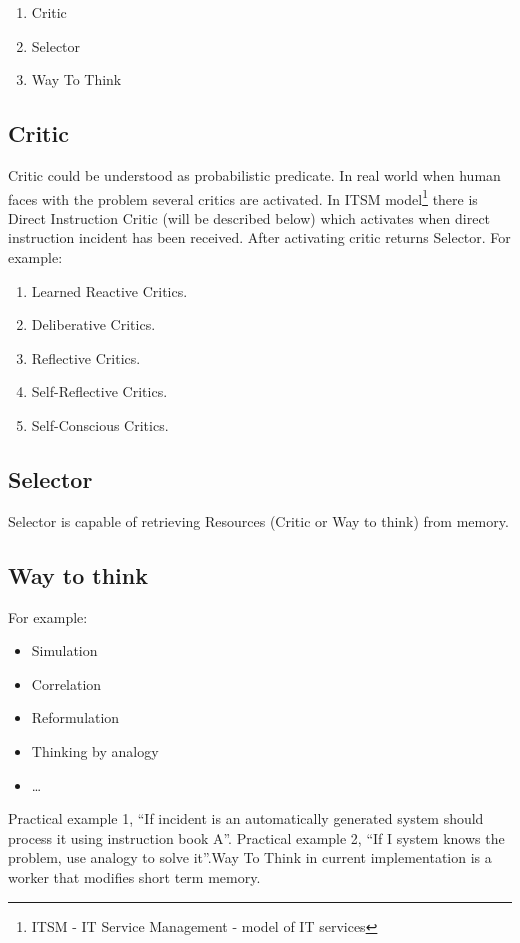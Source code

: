 \documentclass[runningheads,a4paper]{llncs}
\begin{document}
\begin{enumerate}
 \item Critic
 \item Selector
 \item Way To Think
\end{enumerate}

\subsection{Critic}
Critic could be understood as probabilistic predicate. In real world when human faces with the problem several critics are activated. In ITSM model\footnote{ITSM - IT Service Management - model of IT services} there is Direct Instruction Critic (will be described below) which activates when direct instruction incident has been received. After activating critic returns Selector.
For example:

\begin{enumerate}
 \item Learned Reactive Critics.
 \item Deliberative Critics.
 \item Reflective Critics.
 \item Self-Reflective Critics.
 \item Self-Conscious Critics.
\end{enumerate}

\subsection{Selector}
Selector is capable of retrieving Resources (Critic or Way to think) from memory.

\subsection{Way to think}

For example:
\begin{itemize}
 \item Simulation
 \item Correlation
 \item Reformulation
 \item Thinking by analogy
 \item …
\end{itemize}

Practical example 1, “If incident is an automatically generated system should process it using instruction book A”.
Practical example 2, “If I system knows the problem, use analogy to solve it”.Way To Think in current implementation is a worker that modifies short term memory.
\end{document}
